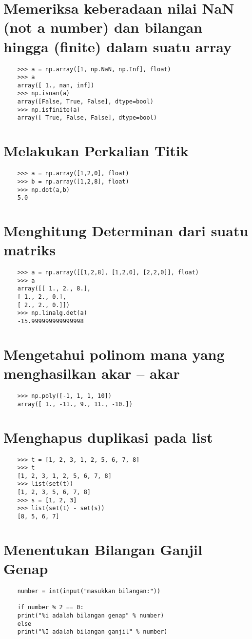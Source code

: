 \documentclass[12pt]{article} %
\begin{document}
\section { Memeriksa keberadaan nilai NaN (not a number) dan bilangan hingga (finite) dalam suatu array}
\begin{lstlisting}
	>>> a = np.array([1, np.NaN, np.Inf], float)
	>>> a
	array([ 1., nan, inf])
	>>> np.isnan(a)
	array([False, True, False], dtype=bool)
	>>> np.isfinite(a)
	array([ True, False, False], dtype=bool)
\end{lstlisting}

\section { Melakukan Perkalian Titik}
\begin{lstlisting}
	>>> a = np.array([1,2,0], float)
	>>> b = np.array([1,2,8], float)
	>>> np.dot(a,b)
	5.0
\end{lstlisting}

\section { Menghitung Determinan dari suatu matriks}
\begin{lstlisting}
	>>> a = np.array([[1,2,8], [1,2,0], [2,2,0]], float)
	>>> a
	array([[ 1., 2., 8.],
	[ 1., 2., 0.],
	[ 2., 2., 0.]])
	>>> np.linalg.det(a)
	-15.999999999999998
\end{lstlisting}

\section {Mengetahui polinom mana yang menghasilkan akar – akar}
\begin{lstlisting}
	>>> np.poly([-1, 1, 1, 10])
	array([ 1., -11., 9., 11., -10.])
\end{lstlisting}

\section {Menghapus duplikasi pada list}
\begin{lstlisting}
	>>> t = [1, 2, 3, 1, 2, 5, 6, 7, 8]
	>>> t
	[1, 2, 3, 1, 2, 5, 6, 7, 8]
	>>> list(set(t))
	[1, 2, 3, 5, 6, 7, 8]
	>>> s = [1, 2, 3]
	>>> list(set(t) - set(s))
	[8, 5, 6, 7]
\end{lstlisting}

\section {Menentukan Bilangan Ganjil Genap}
\begin{lstlisting}
	number = int(input("masukkan bilangan:"))
	
	if number % 2 == 0:
	print("%i adalah bilangan genap" % number)
	else
	print("%I adalah bilangan ganjil" % number)

\end{lstlisting}
\end{document}

